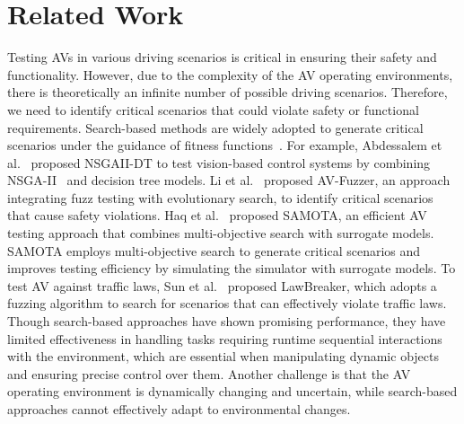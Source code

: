 \section{Related Work}
\label{sec:related_work}
\noindent Testing AVs in various driving scenarios is critical in ensuring their safety and functionality. However, due to the complexity of the AV operating environments, there is theoretically an infinite number of possible driving scenarios. Therefore, we need to identify critical scenarios that could violate safety or functional requirements.
Search-based methods are widely adopted to generate critical scenarios under the guidance of fitness functions~\cite{ben2016testing,abdessalem2018testing,zhong2022neural,10645815,10234383,zhou2023specification}. For example, 
Abdessalem et al.~\cite{abdessalem2018testing} proposed NSGAII-DT to test vision-based control systems by combining NSGA-II~\cite{deb2002fast} and decision tree models.
Li et al.~\cite{li2020av} proposed AV-Fuzzer, an approach integrating fuzz testing with evolutionary search, to identify critical scenarios that cause safety violations. Haq et al.~\cite{haq2022efficient} proposed SAMOTA, an efficient AV testing approach that combines multi-objective search with surrogate models. SAMOTA employs multi-objective search to generate critical scenarios and improves testing efficiency by simulating the simulator with surrogate models. To test AV against traffic laws, Sun et al.~\cite{sun2022lawbreaker} proposed LawBreaker, which adopts a fuzzing algorithm to search for scenarios that can effectively violate traffic laws.
Though search-based approaches have shown promising performance, they have limited effectiveness in handling tasks requiring runtime sequential interactions with the environment, which are essential when manipulating dynamic objects and ensuring precise control over them. Another challenge is that the AV operating environment is dynamically changing and uncertain, while search-based approaches cannot effectively adapt to environmental changes.


